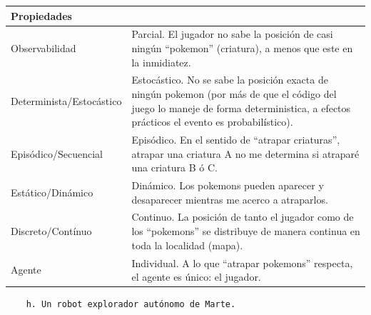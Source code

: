 \documentclass[11pt]{article}
\begin{document}
\begin{longtable}[]{@{}
  >{\raggedright\arraybackslash}p{}
  >{\raggedright\arraybackslash}p{}@{}}
\toprule\noalign{}
\begin{minipage}[b]{\linewidth}\raggedright
Propiedades
\end{minipage} & \begin{minipage}[b]{\linewidth}\raggedright
\end{minipage} \\
\midrule\noalign{}
\endhead
\bottomrule\noalign{}
\endlastfoot
Observabilidad & Parcial. El jugador no sabe la posición de casi ningún
``pokemon'' (criatura), a menos que este en la inmidiatez. \\
Determinista/Estocástico & Estocástico. No se sabe la posición exacta de
ningún pokemon (por más de que el código del juego lo maneje de forma
deterministica, a efectos prácticos el evento es probabilístico). \\
Episódico/Secuencial & Episódico. En el sentido de ``atrapar
criaturas'', atrapar una criatura A no me determina si atraparé una
criatura B ó C. \\
Estático/Dinámico & Dinámico. Los pokemons pueden aparecer y desaparecer
mientras me acerco a atraparlos. \\
Discreto/Contínuo & Continuo. La posición de tanto el jugador como de
los ``pokemons'' se distribuye de manera continua en toda la localidad
(mapa). \\
Agente & Individual. A lo que ``atrapar pokemons'' respecta, el agente
es único: el jugador. \\
\end{longtable}

\begin{verbatim}
    h. Un robot explorador autónomo de Marte.
\end{verbatim}
\end{document}
